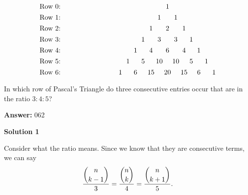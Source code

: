 \begin{enumerate}
 
 \[\begin{array}{c@{\hspace{8em}} c@{\hspace{6pt}}c@{\hspace{6pt}}c@{\hspace{6pt}}c@{\hspace{4pt}}c@{\hspace{2pt}} c@{\hspace{2pt}}c@{\hspace{2pt}}c@{\hspace{2pt}}c@{\hspace{3pt}}c@{\hspace{6pt}} c@{\hspace{6pt}}c@{\hspace{6pt}}c} \vspace{4pt} \text{Row 0: } &    &    &     &     &    &    & 1 &     &     &    &    &    &  \\\vspace{4pt} \text{Row 1: } &    &    &     &     &    & 1 &    & 1  &     &    &    &    &  \\\vspace{4pt} \text{Row 2: } &    &    &     &     & 1 &    & 2 &     & 1  &    &    &    &  \\\vspace{4pt} \text{Row 3: } &    &    &     &  1 &    & 3 &    & 3  &     & 1 &    &    &  \\\vspace{4pt} \text{Row 4: } &    &    & 1  &     & 4 &    & 6 &     & 4  &    & 1 &    &  \\\vspace{4pt} \text{Row 5: } &    & 1 &     & 5  &    &10&    &10 &     & 5 &    & 1 &  \\\vspace{4pt} \text{Row 6: } & 1 &    & 6  &     &15&    &20&     &15 &    & 6 &    & 1 \end{array}\]In which row of Pascal's Triangle do three consecutive entries occur that are in the ratio $3: 4: 5$? 


 
 \textbf{Answer: }062



\textbf{Solution 1}

Consider what the ratio means. Since we know that they are consecutive terms, we can say
 \[\frac{\dbinom{n}{k-1}}{3} = \frac{\dbinom{n}{k}}{4} = \frac{\dbinom{n}{k+1}}{5}.\]


\end{enumerate}
